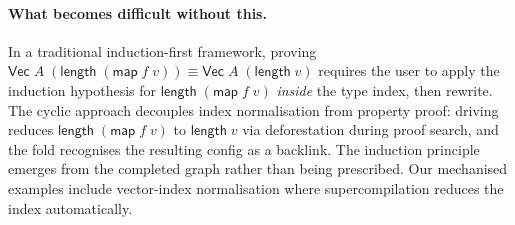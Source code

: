 \paragraph{What becomes difficult without this.} In a traditional induction-first framework, proving $\mathsf{Vec}\;A\;(\mathsf{length}\;(\mathsf{map}\;f\;v)) \equiv \mathsf{Vec}\;A\;(\mathsf{length}\;v)$ requires the user to apply the induction hypothesis for $\mathsf{length}\;(\mathsf{map}\;f\;v)$ \emph{inside} the type index, then rewrite. The cyclic approach decouples index normalisation from property proof: driving reduces $\mathsf{length}\;(\mathsf{map}\;f\;v)$ to $\mathsf{length}\;v$ via deforestation during proof search, and the fold recognises the resulting config as a backlink. The induction principle emerges from the completed graph rather than being prescribed. Our mechanised examples include vector-index normalisation where supercompilation reduces the index automatically.
